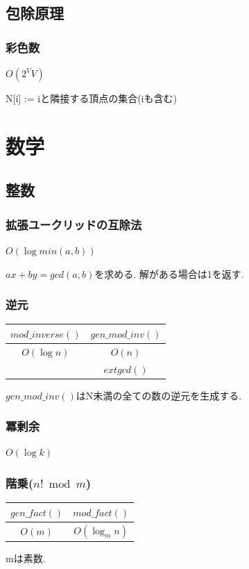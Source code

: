\documentclass[9pt,twocolumn,a4paper,landscape]{extarticle}
\begin{document}
\subsection{包除原理}
\subsubsection{彩色数}
$O(2^VV)$\par
N[i] := iと隣接する頂点の集合(iも含む)\par



\section{数学}
\subsection{整数}
\subsubsection{拡張ユークリッドの互除法}
$O(\log min(a,b))$\par
$ax+by=gcd(a,b)$を求める. 解がある場合は1を返す.


\subsubsection{逆元}
\begin{table}[htb]
  \begin{tabular}{|c|c|} \hline
    $mod\_inverse()$ & $gen\_mod\_inv()$ \\ \hline
    $O(\log n)$ & $O(n)$ \\ \hline
     & $extgcd()$ \\ \hline
  \end{tabular}
\end{table}
$gen\_mod\_inv()$はN未満の全ての数の逆元を生成する.


\subsubsection{冪剰余}
$O(\log k)$\par


\subsubsection{階乗($n! \bmod m$)}
\begin{table}[htb]
  \begin{tabular}{|c|c|} \hline
    $gen\_fact()$ & $mod\_fact()$ \\ \hline
    $O(m)$ & $O(\log_{m} n)$ \\ \hline
  \end{tabular}
\end{table}
mは素数.

\end{document}
